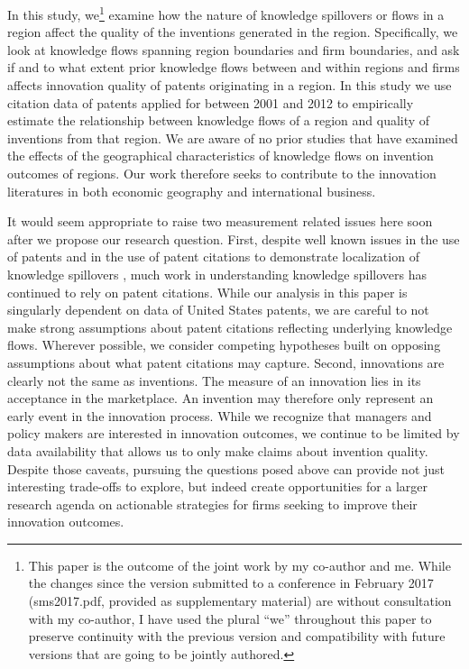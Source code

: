 \documentclass[12pt,letterpaper]{article}
\begin{document}
In this study, we\footnote{This paper is the outcome of the joint work by my co-author and me. While the changes since the version submitted to a conference in February 2017 (sms2017.pdf, provided as supplementary material) are without consultation with my co-author, I have used the plural ``we'' throughout this paper to preserve continuity with the previous version and compatibility with future versions that are going to be jointly authored.} examine how the nature of knowledge spillovers or flows in a region affect the quality of the inventions generated in the region. Specifically, we look at knowledge flows spanning region boundaries and firm boundaries, and ask if and to what extent prior knowledge flows between and within regions and firms affects innovation quality of patents originating in a region. In this study we use citation data of patents applied for between 2001 and 2012 to empirically estimate the relationship between knowledge flows of a region and quality of inventions from that region. We are aware of no prior studies that have examined the effects of the geographical characteristics of knowledge flows on invention outcomes of regions. Our work therefore seeks to contribute to the innovation literatures in both economic geography and international business. \par 

It would seem appropriate to raise two measurement related issues here soon after we propose our research question. First, despite well known issues in the use of patents \citep{Griliches1990, Scherer1984} and in the use of patent citations to demonstrate localization of knowledge spillovers \citep*{Thompson2005, Arora2017a}, much work in understanding knowledge spillovers has continued to rely on patent citations. While our analysis in this paper is singularly dependent on data of United States patents, we are careful to not make strong assumptions about patent citations reflecting underlying knowledge flows. Wherever possible, we consider competing hypotheses built on opposing assumptions about what patent citations may capture. Second, innovations are clearly not the same as inventions. The measure of an innovation lies in its acceptance in the marketplace. An invention may therefore only represent an early event in the innovation process. While we recognize that managers and policy makers are interested in innovation outcomes, we continue to be limited by data availability that allows us to only make claims about invention quality. Despite those caveats, pursuing the questions posed above can provide not just interesting trade-offs to explore, but indeed create opportunities for a larger research agenda on actionable strategies for firms seeking to improve their innovation outcomes.\par
\end{document}
